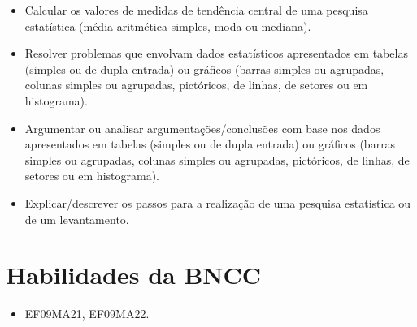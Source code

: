 \begin{escolha}
\begin{boxmedio}
\begin{boxmedio}
{\begin{boxpeq}
\begin{boxpeq}
{\begin{boxpeq}
\begin{boxmedio}
\begin{boxmedio}
\begin{boxpeq}
\begin{boxmedio}
\begin{boxpeq}
\begin{boxpeq}
\begin{boxpeq}
\begin{boxpeq}
\begin{boxmedio}
{\begin{boxmedio}
\begin{boxmedio}
\begin{boxpeq}
\begin{boxmedio}
\begin{boxpeq}
\begin{boxpeq}
\begin{boxpeq}
\begin{escolha}
{\begin{boxmedio}
\begin{boxpeq}
\begin{boxpeq}
\begin{boxpeq}
\begin{boxpeq}
\begin{boxpeq}
\begin{boxmedio}
\begin{boxpeq}
\begin{boxpeq}
\begin{boxpeq}
{\begin{boxpeq}
\begin{boxmedio}
\begin{boxpeq}
\begin{boxpeq}
\begin{boxpeq}
{\begin{boxpeq}
\begin{boxmedio}
{\begin{boxpeq}
\begin{boxpeq}
\begin{boxmedio}
\begin{boxmedio}
\begin{boxpeq}
\begin{boxpeq}
{\begin{boxpeq}
\begin{boxpeq}
\begin{boxpeq}
\begin{boxpeq}
\begin{boxpeq}
\begin{escolha}
\begin{escolha}
{\begin{boxmedio}
\begin{boxpeq}
\begin{q°}
\begin{boxmedio}
\begin{boxpeq}
\begin{boxpeq}
\begin{boxmedio}
\begin{boxmedio}
\begin{boxmedio}
\begin{itemize}
aritmética simples, moda e mediana) ou da amplitude. 
  \item Calcular os valores de medidas de tendência central de uma pesquisa
estatística (média aritmética simples, moda ou mediana). 
  \item Resolver problemas que envolvam dados estatísticos apresentados em
tabelas (simples ou de dupla entrada) ou gráficos (barras simples ou
agrupadas, colunas simples ou agrupadas, pictóricos, de linhas, de setores
ou em histograma). 
  \item Argumentar ou analisar argumentações/conclusões com base nos dados
apresentados em tabelas (simples ou de dupla entrada) ou gráficos (barras
simples ou agrupadas, colunas simples ou agrupadas, pictóricos, de linhas,
de setores ou em histograma). 
  \item Explicar/descrever os passos para a realização de uma pesquisa
estatística ou de um levantamento.

\end{itemize} 

\section{Habilidades da BNCC}

\begin{itemize}
  \item EF09MA21, EF09MA22.
\end{itemize}


\end{boxmedio}
\end{boxmedio}
\end{boxmedio}
\end{boxpeq}
\end{boxpeq}
\end{boxmedio}
\end{q°}
\end{boxpeq}
\end{boxmedio}}
\end{escolha}
\end{escolha}
\end{boxpeq}
\end{boxpeq}
\end{boxpeq}
\end{boxpeq}
\end{boxpeq}}
\end{boxpeq}
\end{boxpeq}
\end{boxmedio}
\end{boxmedio}
\end{boxpeq}
\end{boxpeq}}
\end{boxmedio}
\end{boxpeq}}
\end{boxpeq}
\end{boxpeq}
\end{boxpeq}
\end{boxmedio}
\end{boxpeq}}
\end{boxpeq}
\end{boxpeq}
\end{boxpeq}
\end{boxmedio}
\end{boxpeq}
\end{boxpeq}
\end{boxpeq}
\end{boxpeq}
\end{boxpeq}
\end{boxmedio}}
\end{escolha}
\end{boxpeq}
\end{boxpeq}
\end{boxpeq}
\end{boxmedio}
\end{boxpeq}
\end{boxmedio}
\end{boxmedio}}
\end{boxmedio}
\end{boxpeq}
\end{boxpeq}
\end{boxpeq}
\end{boxpeq}
\end{boxmedio}
\end{boxpeq}
\end{boxmedio}
\end{boxmedio}
\end{boxpeq}}
\end{boxpeq}
\end{boxpeq}}
\end{boxmedio}
\end{boxmedio}
\end{escolha}
